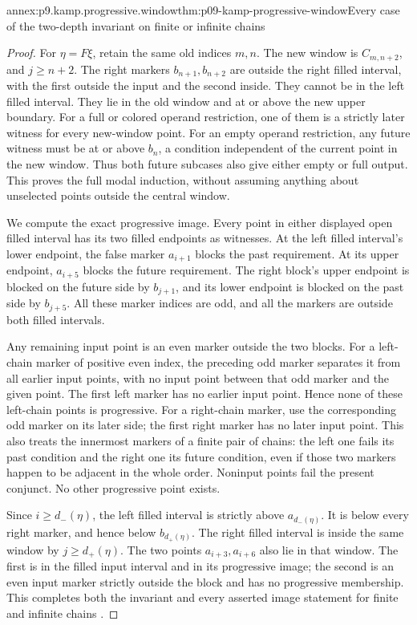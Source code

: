 \begin{annexitem}{annex:p9.kamp.progressive.window}{thm:p09-kamp-progressive-window}{Every case of the two-depth invariant on finite or infinite chains}
\begin{proof}
For \(\eta=F\xi\), retain the same
old indices \(m,n\). The new window
is \(C_{m,n+2}\), and
\(j\geq n+2\). The right markers
\(b_{n+1},b_{n+2}\) are outside
the right filled interval, with the
first outside the input and the
second inside. They cannot be in
the left filled interval. They
lie in the old window and at or
above the new upper boundary.
For a full or colored operand
restriction, one of them is a
strictly later witness for every
new-window point. For an empty
operand restriction, any future
witness must be at or above
\(b_n\), a condition independent
of the current point in the new
window. Thus both future subcases
also give either empty or full
output. This proves the full
modal induction, without assuming
anything about unselected points
outside the central window.

We compute the exact progressive image.
Every point in either displayed open
filled interval has its two filled
endpoints as witnesses. At the left
filled interval's lower endpoint,
the false marker \(a_{i+1}\) blocks
the past requirement. At its upper
endpoint, \(a_{i+5}\) blocks the
future requirement. The right block's
upper endpoint is blocked on the
future side by \(b_{j+1}\), and
its lower endpoint is blocked on
the past side by \(b_{j+5}\).
All these marker indices are odd,
and all the markers are outside
both filled intervals.

Any remaining input point is an
even marker outside the two blocks.
For a left-chain marker of positive
even index, the preceding odd marker
separates it from all earlier input
points, with no input point between
that odd marker and the given point.
The first left marker has no earlier
input point. Hence none of these
left-chain points is progressive.
For a right-chain marker, use the
corresponding odd marker on its
later side; the first right marker
has no later input point. This
also treats the innermost markers
of a finite pair of chains: the
left one fails its past condition
and the right one its future
condition, even if those two
markers happen to be adjacent
in the whole order. Noninput
points fail the present conjunct.
No other progressive point exists.

Since \(i\geq d_-(\eta)\), the
left filled interval is strictly
above \(a_{d_-(\eta)}\). It
is below every right marker,
and hence below \(b_{d_+(\eta)}\).
The right filled interval is
inside the same window by
\(j\geq d_+(\eta)\).
The two points \(a_{i+3},a_{i+6}\)
also lie in that window. The first
is in the filled input interval
and in its progressive image;
the second is an even input
marker strictly outside the
block and has no progressive
membership. This completes
both the invariant and every
asserted image statement for
finite and infinite chains
\cite[p.~117]{Kamp1968}.
\end{proof}
\end{annexitem}

